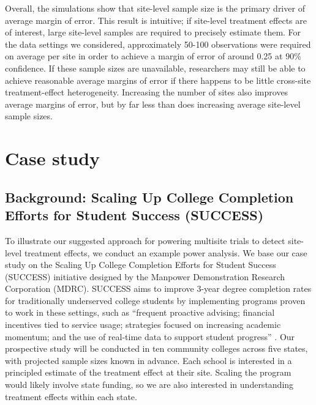 \documentclass[]{article}
\begin{document}
Overall, the simulations show that site-level sample size is the primary driver of average margin of error.
This result is intuitive; if site-level treatment effects are of interest, large site-level samples are required to precisely estimate them.
For the data settings we considered, approximately 50-100 observations were required on average per site in order to achieve a margin of error of around 0.25 at 90\% confidence.
If these sample sizes are unavailable, researchers may still be able to achieve reasonable average margins of error if there happens to be little cross-site treatment-effect heterogeneity.
Increasing the number of sites also improves average margins of error, but by far less than does increasing average site-level sample sizes.


\section{Case study}

\subsection{Background: Scaling Up College Completion Efforts for Student Success (SUCCESS)}

To illustrate our suggested approach for powering multisite trials to detect site-level treatment effects, we conduct an example power analysis.
We base our case study on the Scaling Up College Completion Efforts for Student Success (SUCCESS) initiative designed by the Manpower Demonstration Research Corporation (MDRC).
SUCCESS aims to improve 3-year degree completion rates for traditionally underserved college students by implementing programs proven to work in these settings, such as ``frequent proactive advising; financial incentives tied to service usage; strategies focused on increasing academic momentum; and the use of real-time data to support student progress'' \citep{MDRCsuccess}.
Our prospective study will be conducted in ten community colleges across five states, with projected sample sizes known in advance.
Each school is interested in a principled estimate of the treatment effect at their site.
Scaling the program would likely involve state funding, so we are also interested in understanding treatment effects within each state.
\end{document}
